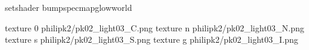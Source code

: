 setshader bumpspecmapglowworld


texture 0 philipk2/pk02_light03_C.png
texture n philipk2/pk02_light03_N.png
texture s philipk2/pk02_light03_S.png
texture g philipk2/pk02_light03_I.png

